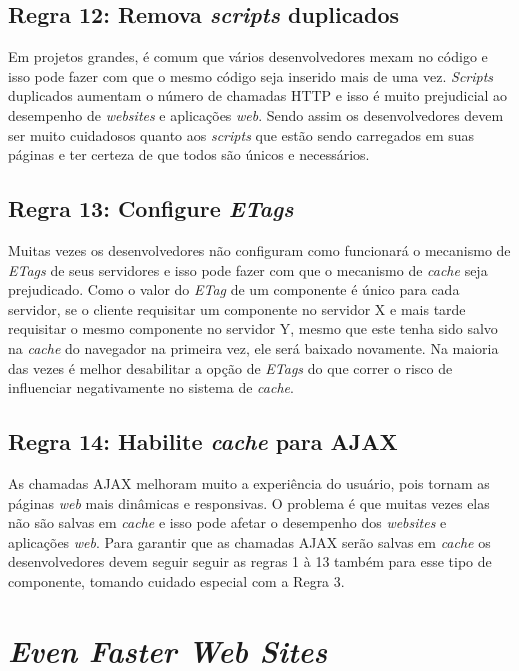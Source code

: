 \subsection{Regra 12: Remova \textit{scripts} duplicados}
\label{subsec:highperformance_regra12}
Em projetos grandes, é comum que vários desenvolvedores mexam no código e isso pode fazer com que o mesmo código seja inserido mais de uma vez. \textit{Scripts} duplicados aumentam o número de chamadas HTTP e isso é muito prejudicial ao desempenho de \textit{websites} e aplicações \textit{web}. Sendo assim os desenvolvedores devem ser muito cuidadosos quanto aos \textit{scripts} que estão sendo carregados em suas páginas e ter certeza de que todos são únicos e necessários.

\subsection{Regra 13: Configure \textit{ETags}}
\label{subsec:highperformance_regra13}
Muitas vezes os desenvolvedores não configuram como funcionará o mecanismo de \textit{ETags} de seus servidores e isso pode fazer com que o mecanismo de \textit{cache} seja prejudicado. Como o valor do \textit{ETag} de um componente é único para cada servidor, se o cliente requisitar um componente no servidor X e mais tarde requisitar o mesmo componente no servidor Y, mesmo que este tenha sido salvo na \textit{cache} do navegador na primeira vez, ele será baixado novamente. Na maioria das vezes é melhor desabilitar a opção de \textit{ETags} do que correr o risco de influenciar negativamente no sistema de \textit{cache}.

\subsection{Regra 14: Habilite \textit{cache} para AJAX}
\label{subsec:highperformance_regra14}
As chamadas AJAX melhoram muito a experiência do usuário, pois tornam as páginas \textit{web} mais dinâmicas e responsivas. O problema é que muitas vezes elas não são salvas em \textit{cache} e isso pode afetar o desempenho dos \textit{websites} e aplicações \textit{web}. Para garantir que as chamadas AJAX serão salvas em \textit{cache} os desenvolvedores devem seguir seguir as regras 1 à 13 também para esse tipo de componente, tomando cuidado especial com a Regra 3.

\section{\textit{Even Faster Web Sites}}
\label{sec:evenfasterwebsites}

